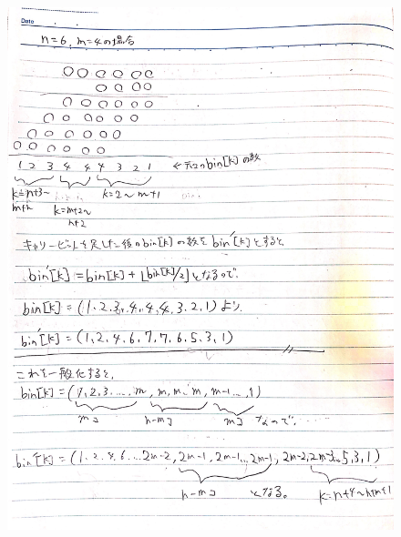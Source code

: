 \documentclass[dvipdfmx,a4paper,12pt]{jsarticle}
\begin{document}
\begin{figure}[htbp]
  \centering
  \includegraphics[width=130mm]{images/IMG_7423.JPG}
\end{figure}
\end{document}
